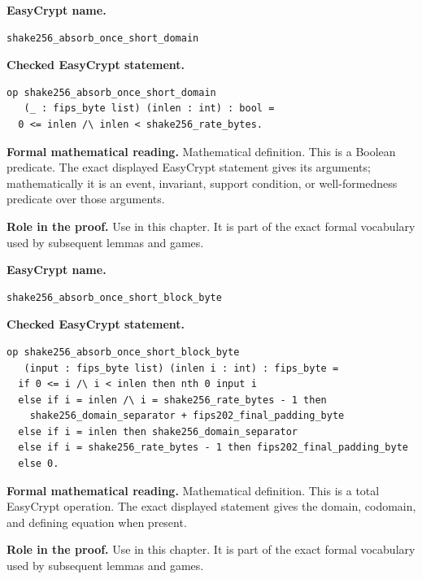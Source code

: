 \begin{formaldefinition}
\noindent\textbf{EasyCrypt name.}
\begin{lstlisting}[language=EasyCrypt,basicstyle=\ttfamily\scriptsize]
shake256_absorb_once_short_domain
\end{lstlisting}
\noindent\textbf{Checked EasyCrypt statement.}
\begin{lstlisting}[language=EasyCrypt,basicstyle=\ttfamily\scriptsize]
op shake256_absorb_once_short_domain
   (_ : fips_byte list) (inlen : int) : bool =
  0 <= inlen /\ inlen < shake256_rate_bytes.
\end{lstlisting}
\noindent\textbf{Formal mathematical reading.}
Mathematical definition. This is a Boolean predicate.  The exact displayed EasyCrypt statement gives its arguments; mathematically it is an event, invariant, support condition, or well-formedness predicate over those arguments.

\noindent\textbf{Role in the proof.}
Use in this chapter. It is part of the exact formal vocabulary used by subsequent lemmas and games.

\end{formaldefinition}

\begin{formaldefinition}
\noindent\textbf{EasyCrypt name.}
\begin{lstlisting}[language=EasyCrypt,basicstyle=\ttfamily\scriptsize]
shake256_absorb_once_short_block_byte
\end{lstlisting}
\noindent\textbf{Checked EasyCrypt statement.}
\begin{lstlisting}[language=EasyCrypt,basicstyle=\ttfamily\scriptsize]
op shake256_absorb_once_short_block_byte
   (input : fips_byte list) (inlen i : int) : fips_byte =
  if 0 <= i /\ i < inlen then nth 0 input i
  else if i = inlen /\ i = shake256_rate_bytes - 1 then
    shake256_domain_separator + fips202_final_padding_byte
  else if i = inlen then shake256_domain_separator
  else if i = shake256_rate_bytes - 1 then fips202_final_padding_byte
  else 0.
\end{lstlisting}
\noindent\textbf{Formal mathematical reading.}
Mathematical definition. This is a total EasyCrypt operation.  The exact displayed statement gives the domain, codomain, and defining equation when present.

\noindent\textbf{Role in the proof.}
Use in this chapter. It is part of the exact formal vocabulary used by subsequent lemmas and games.

\end{formaldefinition}

